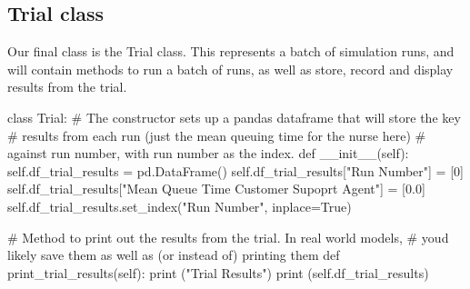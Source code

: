 \documentclass[
  letterpaper,
  DIV=11,
  numbers=noendperiod]{scrreprt}
\newenvironment{Shaded}{}{}
\newcommand{\BuiltInTok}[1]{\textcolor[rgb]{0.84,0.23,0.29}{#1}}
\newcommand{\CommentTok}[1]{\textcolor[rgb]{0.42,0.45,0.49}{#1}}
\newcommand{\DecValTok}[1]{\textcolor[rgb]{0.00,0.36,0.77}{#1}}
\newcommand{\FloatTok}[1]{\textcolor[rgb]{0.00,0.36,0.77}{#1}}
\newcommand{\FunctionTok}[1]{\textcolor[rgb]{0.44,0.26,0.76}{#1}}
\newcommand{\KeywordTok}[1]{\textcolor[rgb]{0.84,0.23,0.29}{#1}}
\newcommand{\NormalTok}[1]{\textcolor[rgb]{0.14,0.16,0.18}{#1}}
\newcommand{\OperatorTok}[1]{\textcolor[rgb]{0.14,0.16,0.18}{#1}}
\newcommand{\StringTok}[1]{\textcolor[rgb]{0.01,0.18,0.38}{#1}}
\newcommand{\VariableTok}[1]{\textcolor[rgb]{0.89,0.38,0.04}{#1}}
\begin{document}
\subsection{Trial class}\label{trial-class}

Our final class is the Trial class. This represents a batch of
simulation runs, and will contain methods to run a batch of runs, as
well as store, record and display results from the trial.

\begin{tcolorbox}[enhanced jigsaw, colframe=quarto-callout-note-color-frame, bottomtitle=1mm, breakable, rightrule=.15mm, coltitle=black, colbacktitle=quarto-callout-note-color!10!white, opacityback=0, leftrule=.75mm, arc=.35mm, toptitle=1mm, title=\textcolor{quarto-callout-note-color}{\faInfo}\hspace{0.5em}{Example trial class}, titlerule=0mm, colback=white, toprule=.15mm, bottomrule=.15mm, left=2mm, opacitybacktitle=0.6]

\begin{Shaded}
\begin{Highlighting}[]
\KeywordTok{class}\NormalTok{ Trial:}
    \CommentTok{\# The constructor sets up a pandas dataframe that will store the key}
    \CommentTok{\# results from each run (just the mean queuing time for the nurse here)}
    \CommentTok{\# against run number, with run number as the index.}
    \KeywordTok{def}  \FunctionTok{\_\_init\_\_}\NormalTok{(}\VariableTok{self}\NormalTok{):}
        \VariableTok{self}\NormalTok{.df\_trial\_results }\OperatorTok{=}\NormalTok{ pd.DataFrame()}
        \VariableTok{self}\NormalTok{.df\_trial\_results[}\StringTok{"Run Number"}\NormalTok{] }\OperatorTok{=}\NormalTok{ [}\DecValTok{0}\NormalTok{]}
        \VariableTok{self}\NormalTok{.df\_trial\_results[}\StringTok{"Mean Queue Time Customer Supoprt Agent"}\NormalTok{] }\OperatorTok{=}\NormalTok{ [}\FloatTok{0.0}\NormalTok{]}
        \VariableTok{self}\NormalTok{.df\_trial\_results.set\_index(}\StringTok{"Run Number"}\NormalTok{, inplace}\OperatorTok{=}\VariableTok{True}\NormalTok{)}

    \CommentTok{\# Method to print out the results from the trial.  In real world models,}
    \CommentTok{\# you\textquotesingle{}d likely save them as well as (or instead of) printing them}
    \KeywordTok{def}\NormalTok{ print\_trial\_results(}\VariableTok{self}\NormalTok{):}
        \BuiltInTok{print}\NormalTok{ (}\StringTok{"Trial Results"}\NormalTok{)}
        \BuiltInTok{print}\NormalTok{ (}\VariableTok{self}\NormalTok{.df\_trial\_results)}


\end{Highlighting}
\end{Shaded}
\end{tcolorbox}
\end{document}
